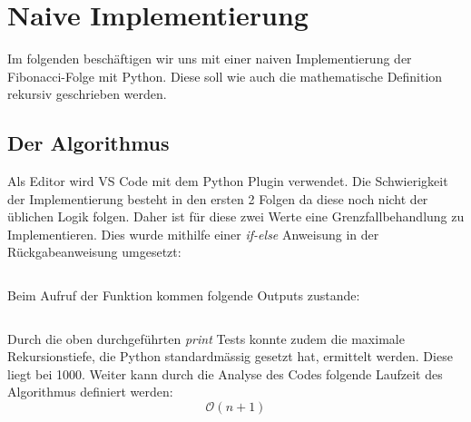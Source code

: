 \section{Naive Implementierung}
Im folgenden beschäftigen wir uns mit einer naiven
Implementierung der Fibonacci-Folge mit Python.
Diese soll wie auch die mathematische Definition rekursiv geschrieben werden.
\subsection{Der Algorithmus}
Als Editor wird VS Code mit dem Python Plugin verwendet.
Die Schwierigkeit der Implementierung besteht in den
ersten 2 Folgen da diese noch nicht der üblichen Logik folgen.
Daher ist für diese zwei Werte eine Grenzfallbehandlung
zu Implementieren. Dies wurde mithilfe einer \textit{if-else}
Anweisung in der Rückgabeanweisung umgesetzt:
\begin{mdframed}[backgroundcolor=bg]
    \inputminted{Python}{src/naive_fibonacci.py}
\end{mdframed}
Beim Aufruf der Funktion kommen folgende Outputs zustande:
\begin{mdframed}[backgroundcolor=bg]
    \inputminted{Python}{src/naive_fibonacci_test.py}
\end{mdframed}
Durch die oben durchgeführten \textit{print} Tests konnte
zudem die maximale Rekursionstiefe, die Python standardmässig
gesetzt hat, ermittelt werden. 
Diese liegt bei 1000. 
Weiter kann durch die Analyse des Codes folgende
Laufzeit des Algorithmus definiert werden:
\begin{equation}
    \mathcal{O}(n + 1)
\end{equation}

